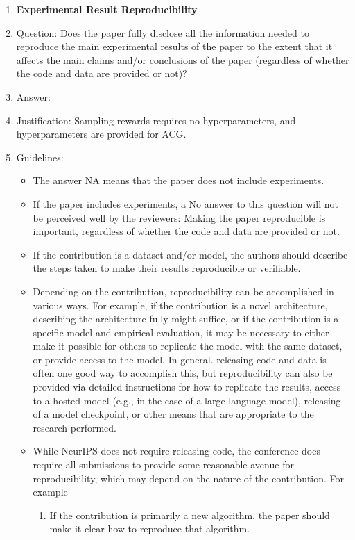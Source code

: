 \documentclass{article}
\begin{document}
\begin{enumerate}
    \item {\bf Experimental Result Reproducibility}
    \item[] Question: Does the paper fully disclose all the information needed to reproduce the main experimental results of the paper to the extent that it affects the main claims and/or conclusions of the paper (regardless of whether the code and data are provided or not)?
    \item[] Answer: \answerYes{} %
    \item[] Justification: Sampling rewards requires no hyperparameters, and hyperparameters are provided for ACG.
    \item[] Guidelines:
    \begin{itemize}
        \item The answer NA means that the paper does not include experiments.
        \item If the paper includes experiments, a No answer to this question will not be perceived well by the reviewers: Making the paper reproducible is important, regardless of whether the code and data are provided or not.
        \item If the contribution is a dataset and/or model, the authors should describe the steps taken to make their results reproducible or verifiable. 
        \item Depending on the contribution, reproducibility can be accomplished in various ways. For example, if the contribution is a novel architecture, describing the architecture fully might suffice, or if the contribution is a specific model and empirical evaluation, it may be necessary to either make it possible for others to replicate the model with the same dataset, or provide access to the model. In general. releasing code and data is often one good way to accomplish this, but reproducibility can also be provided via detailed instructions for how to replicate the results, access to a hosted model (e.g., in the case of a large language model), releasing of a model checkpoint, or other means that are appropriate to the research performed.
        \item While NeurIPS does not require releasing code, the conference does require all submissions to provide some reasonable avenue for reproducibility, which may depend on the nature of the contribution. For example
        \begin{enumerate}
            \item If the contribution is primarily a new algorithm, the paper should make it clear how to reproduce that algorithm.

\end{enumerate}
\end{itemize}
\end{enumerate}
\end{document}
